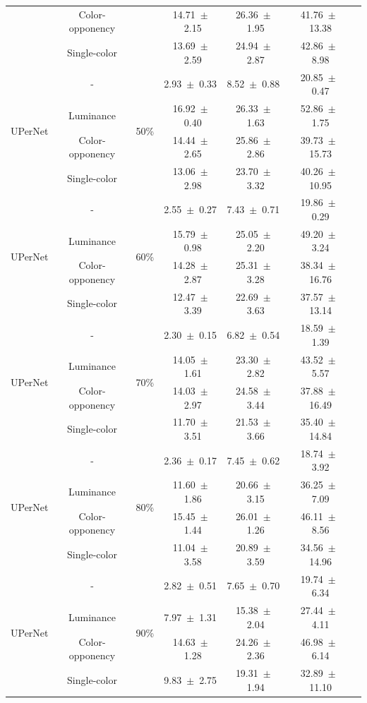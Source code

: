 \begin{table}[h]
\begin{tabular}{@{}lccc ccc@{}}
& Color-opponency & & 14.71~$\pm$~2.15 & 26.36~$\pm$~1.95 & 41.76~$\pm$~13.38 \\
& Single-color & & 13.69~$\pm$~2.59 & 24.94~$\pm$~2.87 & 42.86~$\pm$~8.98 \\
\midrule
\multirow{4}{*}{UPerNet} & - & \multirow{4}{*}{50\%} & 2.93~$\pm$~0.33 & 8.52~$\pm$~0.88 & 20.85~$\pm$~0.47 \\
& Luminance & & 16.92~$\pm$~0.40 & 26.33~$\pm$~1.63 & 52.86~$\pm$~1.75 \\
& Color-opponency & & 14.44~$\pm$~2.65 & 25.86~$\pm$~2.86 & 39.73~$\pm$~15.73 \\
& Single-color & & 13.06~$\pm$~2.98 & 23.70~$\pm$~3.32 & 40.26~$\pm$~10.95 \\
\midrule
\multirow{4}{*}{UPerNet} & - & \multirow{4}{*}{60\%} & 2.55~$\pm$~0.27 & 7.43~$\pm$~0.71 & 19.86~$\pm$~0.29 \\
& Luminance & & 15.79~$\pm$~0.98 & 25.05~$\pm$~2.20 & 49.20~$\pm$~3.24 \\
& Color-opponency & & 14.28~$\pm$~2.87 & 25.31~$\pm$~3.28 & 38.34~$\pm$~16.76 \\
& Single-color & & 12.47~$\pm$~3.39 & 22.69~$\pm$~3.63 & 37.57~$\pm$~13.14 \\
\midrule
\multirow{4}{*}{UPerNet} & - & \multirow{4}{*}{70\%} & 2.30~$\pm$~0.15 & 6.82~$\pm$~0.54 & 18.59~$\pm$~1.39 \\
& Luminance & & 14.05~$\pm$~1.61 & 23.30~$\pm$~2.82 & 43.52~$\pm$~5.57 \\
& Color-opponency & & 14.03~$\pm$~2.97 & 24.58~$\pm$~3.44 & 37.88~$\pm$~16.49 \\
& Single-color & & 11.70~$\pm$~3.51 & 21.53~$\pm$~3.66 & 35.40~$\pm$~14.84 \\
\midrule
\multirow{4}{*}{UPerNet} & - & \multirow{4}{*}{80\%} & 2.36~$\pm$~0.17 & 7.45~$\pm$~0.62 & 18.74~$\pm$~3.92 \\
& Luminance & & 11.60~$\pm$~1.86 & 20.66~$\pm$~3.15 & 36.25~$\pm$~7.09 \\
& Color-opponency & & 15.45~$\pm$~1.44 & 26.01~$\pm$~1.26 & 46.11~$\pm$~8.56 \\
& Single-color & & 11.04~$\pm$~3.58 & 20.89~$\pm$~3.59 & 34.56~$\pm$~14.96 \\
\midrule
\multirow{4}{*}{UPerNet} & - & \multirow{4}{*}{90\%} & 2.82~$\pm$~0.51 & 7.65~$\pm$~0.70 & 19.74~$\pm$~6.34 \\
& Luminance & & 7.97~$\pm$~1.31 & 15.38~$\pm$~2.04 & 27.44~$\pm$~4.11 \\
& Color-opponency & & 14.63~$\pm$~1.28 & 24.26~$\pm$~2.36 & 46.98~$\pm$~6.14 \\
& Single-color & & 9.83~$\pm$~2.75 & 19.31~$\pm$~1.94 & 32.89~$\pm$~11.10 \\
\midrule
\bottomrule
\end{tabular}
\label{tab:sparse_results_upernet_acdc_night}
\end{table}
